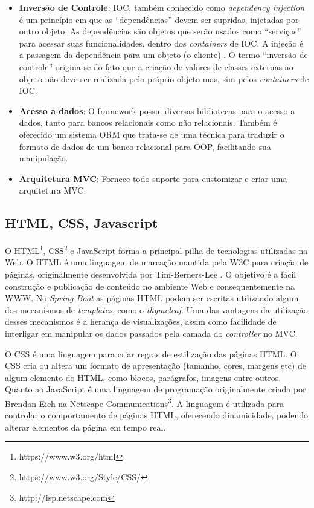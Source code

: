 \begin{itemize}
	\item{\textbf{Inversão de Controle}: \ac{IOC}, também conhecido como \textit{dependency injection} é um princípio em que as “dependências” devem ser supridas, injetadas por outro objeto. As dependências são objetos que serão usados como “serviços” para acessar suas funcionalidades, dentro dos \textit{containers} de \ac{IOC}. A injeção é a passagem da dependência para um objeto (o cliente) \citep{DependencyInjection2006}. O termo “inversão de controle” origina-se do fato que a criação de valores de classes externas ao objeto não deve ser realizada pelo próprio objeto mas, sim pelos \textit{containers} de \ac{IOC}.}

	\item{\textbf{Acesso a dados}: O framework possui diversas bibliotecas para o acesso a dados, tanto para bancos relacionais como não relacionais. Também é oferecido um sistema \ac{ORM} que trata-se de uma técnica para traduzir o formato de dados de um banco relacional para \ac{OOP}, facilitando sua manipulação.}

	\item{\textbf{Arquitetura MVC}: Fornece todo suporte para customizar e criar uma arquitetura \ac{MVC}.}
\end{itemize}

\subsection{HTML, CSS, Javascript}

O HTML\footnote{https://www.w3.org/html}, \ac{CSS}\footnote{https://www.w3.org/Style/CSS/} e JavaScript forma a principal pilha de tecnologias utilizadas na Web. O HTML é uma linguagem de marcação mantida pela \ac{W3C} para criação de páginas, originalmente desenvolvida por Tim-Berners-Lee \citep{Raggett1998}. O objetivo é a fácil construção e publicação de conteúdo no ambiente Web e consequentemente na \ac{WWW}. No \textit{Spring Boot} as páginas HTML podem ser escritas utilizando algum dos mecanismos de \textit{templates}, como o \textit{thymeleaf}. Uma das vantagens da utilização desses mecanismos é a herança de visualizações, assim como facilidade de interligar em manipular os dados passados pela camada do \textit{controller} no \ac{MVC}.

O \ac{CSS} é uma linguagem para criar regras de estilização das páginas \ac{HTML}. O CSS cria ou altera um formato de apresentação (tamanho, cores, margens etc) de algum elemento do HTML, como blocos, parágrafos, imagens entre outros. Quanto ao JavaScript é uma linguagem de programação originalmente criada por Brendan Eich na Netscape Communications\footnote{ http://isp.netscape.com}. A linguagem é utilizada para controlar o comportamento de páginas HTML, oferecendo dinamicidade, podendo alterar elementos da página em tempo real.

